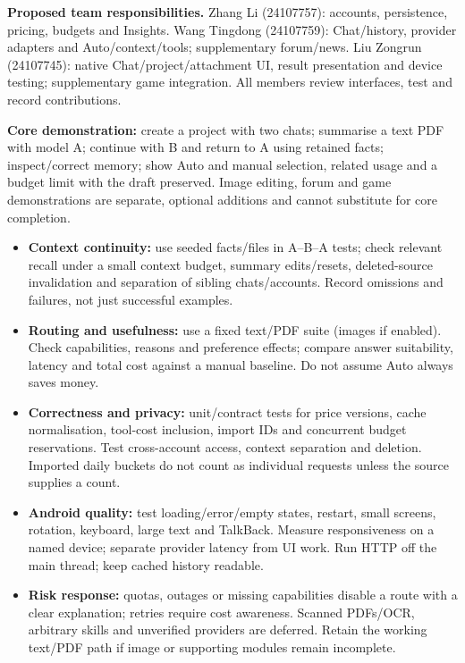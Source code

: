 \documentclass[10pt,a4paper]{article}
\newcommand{\sect}[2]{\par\vspace{6pt}{\sffamily\bfseries\fontsize{12.5}{15}\selectfont\color{ink}#1\enspace #2}\par\vspace{2pt}}
\newcommand{\sub}[1]{\par\vspace{3pt}\textbf{\color{ink}#1}\enspace}
\begin{document}
\sub{Proposed team responsibilities.}
Zhang Li (24107757): accounts, persistence, pricing, budgets and Insights. Wang Tingdong (24107759): Chat/history, provider adapters and Auto/context/tools; supplementary forum/news. Liu Zongrun (24107745): native Chat/project/attachment UI, result presentation and device testing; supplementary game integration. All members review interfaces, test and record contributions.

\sect{9}{Evaluation, risks and completion criteria}
\textbf{Core demonstration:} create a project with two chats; summarise a text PDF with model A; continue with B and return to A using retained facts; inspect/correct memory; show Auto and manual selection, related usage and a budget limit with the draft preserved. Image editing, forum and game demonstrations are separate, optional additions and cannot substitute for core completion.

\begin{itemize}
\item \textbf{Context continuity:} use seeded facts/files in A--B--A tests; check relevant recall under a small context budget, summary edits/resets, deleted-source invalidation and separation of sibling chats/accounts. Record omissions and failures, not just successful examples.
\item \textbf{Routing and usefulness:} use a fixed text/PDF suite (images if enabled). Check capabilities, reasons and preference effects; compare answer suitability, latency and total cost against a manual baseline. Do not assume Auto always saves money.
\item \textbf{Correctness and privacy:} unit/contract tests for price versions, cache normalisation, tool-cost inclusion, import IDs and concurrent budget reservations. Test cross-account access, context separation and deletion. Imported daily buckets do not count as individual requests unless the source supplies a count.
\item \textbf{Android quality:} test loading/error/empty states, restart, small screens, rotation, keyboard, large text and TalkBack. Measure responsiveness on a named device; separate provider latency from UI work. Run HTTP off the main thread; keep cached history readable.
\item \textbf{Risk response:} quotas, outages or missing capabilities disable a route with a clear explanation; retries require cost awareness. Scanned PDFs/OCR, arbitrary skills and unverified providers are deferred. Retain the working text/PDF path if image or supporting modules remain incomplete.
\end{itemize}
\end{document}
